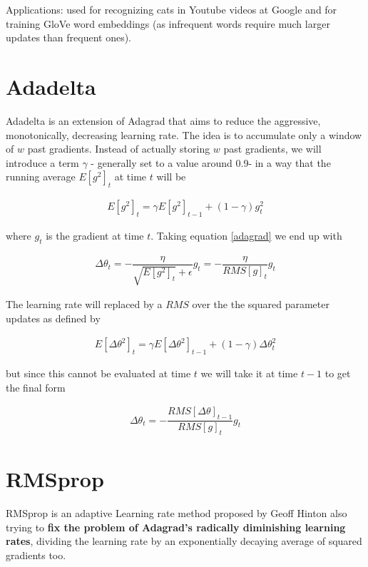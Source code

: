 \documentclass[10pt]{article} %
\theoremstyle{question-style}
\begin{document}
\begin{flushleft}
Applications: used for recognizing cats in Youtube videos at Google and for training GloVe word embeddings (as infrequent words require much larger updates than frequent ones).


\section{Adadelta}
Adadelta is an extension of Adagrad that aims to reduce the aggressive, monotonically, decreasing learning rate. The idea is to accumulate only a window of $w$ past gradients. Instead of actually storing $w$ past gradients, we will introduce a term $\gamma$ - generally set to a value around 0.9-  in a way that the running average $E\left[g^2\right]_t$ at time $t$ will be

\begin{align*}
    E\left[g^2\right]_t = \gamma E\left[g^2\right]_{t-1} + \left( 1 - \gamma \right) g^2_t
\end{align*}

where $g_t$ is the gradient at time $t$. Taking equation \ref{adagrad} we end up with

\begin{align*} 
    \Delta \theta_{t} = - \dfrac{\eta}{\sqrt{E\left[g^2\right]_t} + \epsilon} g_t = - \dfrac{\eta}{RMS \left[g\right]_t} g_t
\end{align*}

The learning rate will replaced by a $RMS$ over the the squared parameter updates as defined by 

\begin{align*} 
    E\left[\Delta \theta^2\right]_t = \gamma E\left[\Delta \theta^2\right]_{t-1} + \left( 1 - \gamma \right) \Delta \theta^2_t
\end{align*}

but since this cannot be evaluated at time $t$ we will take it at time $t-1$ to get the final form

\begin{align*} 
    \Delta \theta_{t} = - \dfrac{RMS \left[\Delta \theta \right]_{t-1}}{RMS \left[g\right]_t} g_t
\end{align*}

\section{RMSprop}

RMSprop is an adaptive Learning rate method proposed by Geoff Hinton also trying to \textbf{fix the problem of Adagrad's radically diminishing learning rates}, dividing the learning rate by an exponentially decaying average of squared gradients too. \\ 


\end{flushleft}
\end{document}
